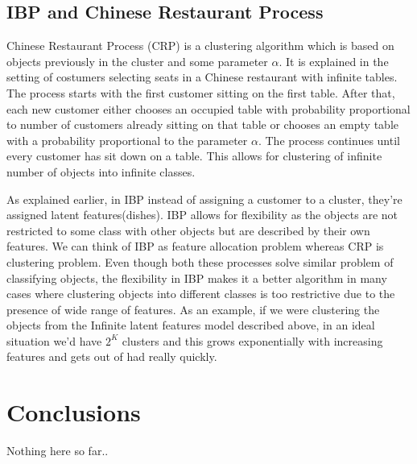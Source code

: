 \documentclass{article}
\begin{document}
\subsection{IBP and Chinese Restaurant Process}

Chinese Restaurant Process (CRP) is a clustering algorithm which is based on objects previously in the cluster and some parameter $\alpha$. It is explained in the setting of costumers selecting seats in a Chinese restaurant with infinite tables. The process starts with the first customer sitting on the first table. After that, each new customer either chooses an occupied table with probability proportional to number of customers already sitting on that table or chooses an empty table with a probability proportional to the parameter $\alpha$. The process continues until every customer has sit down on a table. This allows for clustering of infinite number of objects into infinite classes.

As explained earlier, in IBP instead of assigning a customer to a cluster, they're assigned latent features(dishes). IBP allows for flexibility as the objects are not restricted to some class with other objects but are described by their own features. We can think of IBP as feature allocation problem whereas CRP is clustering problem. Even though both these processes solve similar problem of classifying objects, the flexibility in IBP makes it a better algorithm in many cases where clustering objects into different classes is too restrictive due to the presence of wide range of features. As an example, if we were clustering the objects from the Infinite latent features model described above, in an ideal situation we'd have $2^K$ clusters and this grows exponentially with increasing features and gets out of had really quickly.


\section{Conclusions}
Nothing here so far..


{}

\end{document}
